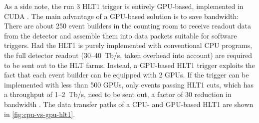As a side note, the run 3 HLT1 trigger is entirely GPU-based, implemented in
CUDA \cite{Allen_GPU_2020}.
The main advantage of a GPU-based solution is to save bandwidth:
There are about 250 event builders in the counting room to receive readout data
from the detector and assemble them into data packets suitable for software
triggers.
Had the HLT1 is purely implemented with conventional CPU programs,
the full detector readout (30--40~Tb/s, taken overhead into account) are
required to be sent out to the HLT farms.
Instead, a GPU-based HLT1 trigger exploits the fact that each event builder
can be equipped with 2 GPUs.
If the trigger can be implemented with less than 500 GPUs,
only events passing HLT1 cuts, which has a throughput of 1--2~Tb/s,
need to be sent out,
a factor of 30 reduction in bandwidth \cite{Allen_GPU_2020}.
The data transfer paths of a CPU- and GPU-based HLT1 are shown in
\cref{fig:cpu-vs-gpu-hlt1}.

